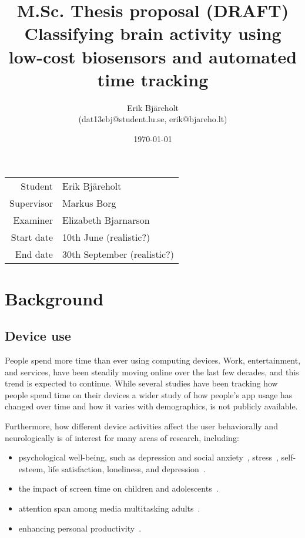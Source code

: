 \documentclass{IEEEtran}
\title{%
    \large M.Sc. Thesis proposal (DRAFT)\\
    \huge Classifying brain activity using low-cost biosensors and automated time tracking \\
}
\author{Erik Bjäreholt \\(dat13ebj@student.lu.se, erik@bjareho.lt)}
\date{\today}
\begin{document}
\maketitle

\begin{center}
\begin{tabular}{r l}
 Student & Erik Bjäreholt \\
 Supervisor & Markus Borg \\
 Examiner & Elizabeth Bjarnarson \\
 Start date & 10th June (realistic?) \\
 End date & 30th September (realistic?) \\
\end{tabular}
\end{center}

\tableofcontents

\section{Background}


\subsection{Device use}

People spend more time than ever using computing devices. Work, entertainment, and services, have been steadily moving online over the last few decades, and this trend is expected to continue. While several studies have been tracking how people spend time on their devices a wider study of how people's app usage has changed over time and how it varies with demographics, is not publicly available.

Furthermore, how different device activities affect the user behaviorally and neurologically is of interest for many areas of research, including:

\begin{itemize}
    \item psychological well-being, such as depression and social anxiety~\cite{selfhout_different_2009}\cite{shah_nonrecursive_2002}, stress~\cite{mark_stress_2014}, self-esteem, life satisfaction, loneliness, and depression~\cite{huang_time_2017}.
    \item the impact of screen time on children and adolescents~\cite{subrahmanyam_impact_2001}.
    \item attention span among media multitasking adults~\cite{mark_stress_2014}.
    \item enhancing personal productivity~\cite{kim_timeaware_2016}.
\end{itemize}
\end{document}
